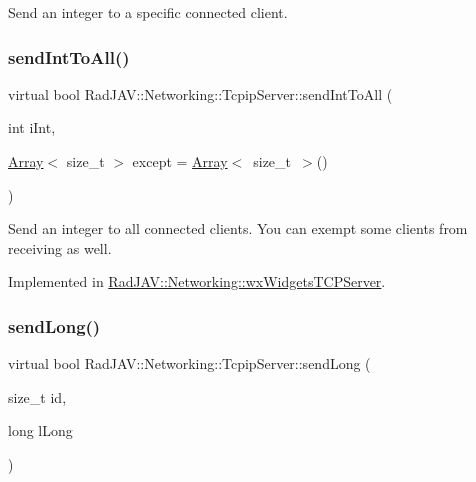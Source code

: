 Send an integer to a specific connected client. \mbox{\label{class_rad_j_a_v_1_1_networking_1_1_tcpip_server_afaa133f1ac712598f54c5eb3f248e163}} 
\subsubsection{\texorpdfstring{send\+Int\+To\+All()}{sendIntToAll()}}
{\footnotesize\ttfamily virtual bool Rad\+J\+A\+V\+::\+Networking\+::\+Tcpip\+Server\+::send\+Int\+To\+All (\begin{DoxyParamCaption}\item[{int}]{i\+Int,  }\item[{\mbox{\hyperlink{class_rad_j_a_v_1_1_array}{Array}}$<$ size\+\_\+t $>$}]{except = {\ttfamily \mbox{\hyperlink{class_rad_j_a_v_1_1_array}{Array}}$<$~size\+\_\+t~$>$()} }\end{DoxyParamCaption})\hspace{0.3cm}{\ttfamily [pure virtual]}}

Send an integer to all connected clients. You can exempt some clients from receiving as well. 

Implemented in \mbox{\hyperlink{class_rad_j_a_v_1_1_networking_1_1wx_widgets_t_c_p_server_aabb486086e700bbc52729d91b4500d0c}{Rad\+J\+A\+V\+::\+Networking\+::wx\+Widgets\+T\+C\+P\+Server}}.

\mbox{\label{class_rad_j_a_v_1_1_networking_1_1_tcpip_server_a02d65d1ce114f23a84fc289eddda8f7d}} 
\subsubsection{\texorpdfstring{send\+Long()}{sendLong()}}
{\footnotesize\ttfamily virtual bool Rad\+J\+A\+V\+::\+Networking\+::\+Tcpip\+Server\+::send\+Long (\begin{DoxyParamCaption}\item[{size\+\_\+t}]{id,  }\item[{long}]{l\+Long }\end{DoxyParamCaption})\hspace{0.3cm}{\ttfamily [pure virtual]}}

